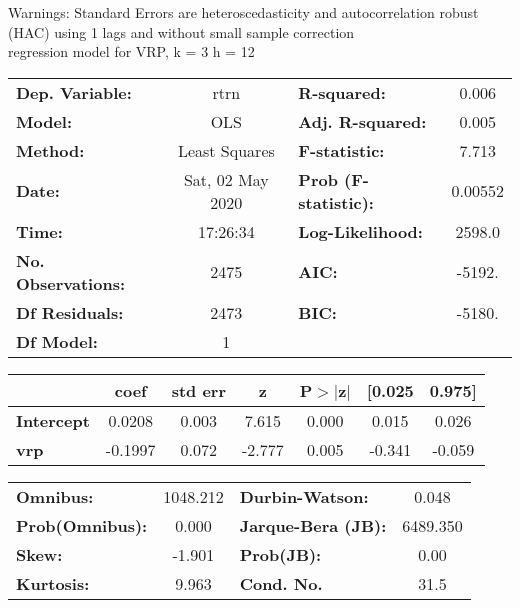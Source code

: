 Warnings: \newline
 [1] Standard Errors are heteroscedasticity and autocorrelation robust (HAC) using 1 lags and without small sample correction\\ 

regression model for VRP, k = 3 h = 12\begin{center}
\begin{tabular}{lclc}
\toprule
\textbf{Dep. Variable:}    &       rtrn       & \textbf{  R-squared:         } &     0.006   \\
\textbf{Model:}            &       OLS        & \textbf{  Adj. R-squared:    } &     0.005   \\
\textbf{Method:}           &  Least Squares   & \textbf{  F-statistic:       } &     7.713   \\
\textbf{Date:}             & Sat, 02 May 2020 & \textbf{  Prob (F-statistic):} &  0.00552    \\
\textbf{Time:}             &     17:26:34     & \textbf{  Log-Likelihood:    } &    2598.0   \\
\textbf{No. Observations:} &        2475      & \textbf{  AIC:               } &    -5192.   \\
\textbf{Df Residuals:}     &        2473      & \textbf{  BIC:               } &    -5180.   \\
\textbf{Df Model:}         &           1      & \textbf{                     } &             \\
\bottomrule
\end{tabular}
\begin{tabular}{lcccccc}
                   & \textbf{coef} & \textbf{std err} & \textbf{z} & \textbf{P$> |$z$|$} & \textbf{[0.025} & \textbf{0.975]}  \\
\midrule
\textbf{Intercept} &       0.0208  &        0.003     &     7.615  &         0.000        &        0.015    &        0.026     \\
\textbf{vrp}       &      -0.1997  &        0.072     &    -2.777  &         0.005        &       -0.341    &       -0.059     \\
\bottomrule
\end{tabular}
\begin{tabular}{lclc}
\textbf{Omnibus:}       & 1048.212 & \textbf{  Durbin-Watson:     } &    0.048  \\
\textbf{Prob(Omnibus):} &   0.000  & \textbf{  Jarque-Bera (JB):  } & 6489.350  \\
\textbf{Skew:}          &  -1.901  & \textbf{  Prob(JB):          } &     0.00  \\
\textbf{Kurtosis:}      &   9.963  & \textbf{  Cond. No.          } &     31.5  \\
\bottomrule
\end{tabular}
\end{center}

